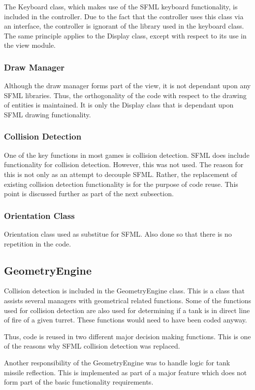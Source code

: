 \documentclass[10pt,twocolumn]{witseiepaper}
\begin{document}
The Keyboard class, which makes use of the SFML keyboard functionality, is included in the controller. Due to the fact that the controller uses this class via an interface, the controller is ignorant of the library used in the keyboard class. The same principle applies to the Display class, except with respect to its use in the view module. 

\subsubsection{Draw Manager} Although the draw manager forms part of the view, it is not dependant upon any SFML libraries. Thus, the orthogonality of the code with respect to the drawing of entities is maintained. It is only the Display class that is dependant upon SFML drawing functionality.

\subsubsection{Collision Detection} One of the key functions in most games is collision detection. SFML does include functionality for collision detection. However, this was not used. The reason for this is not only as an attempt to decouple SFML. Rather, the replacement of existing collision detection functionality is for the purpose of code reuse. This point is discussed further as part of the next subsection.

\subsubsection{Orientation Class} %
Orientation class used as substitue for SFML. Also done so that there is no repetition in the code.

\subsection{GeometryEngine}
Collision detection is included in the GeometryEngine class. This is a class that assists several managers with geometrical related functions. Some of the functions used for collision detection are also used for determining if a tank is in direct line of fire of a given turret. These functions would need to have been coded anyway. 

Thus, code is reused in two different major decision making functions. This is one of the reasons why SFML collision detection was replaced. 

Another responsibility of the GeometryEngine was to handle logic for tank missile reflection. This is implemented as part of a major feature which does not form part of the basic functionality requirements.
\end{document}
